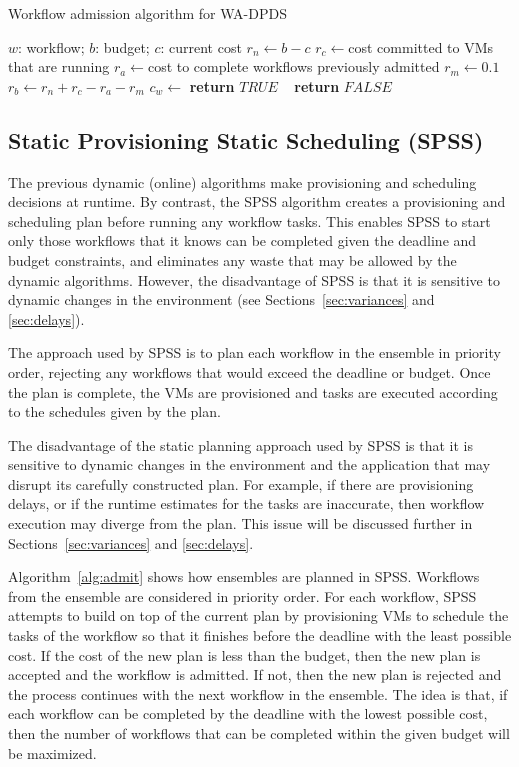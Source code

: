 \documentclass[preprint,5p]{elsarticle}
\begin{document}
\begin{algorithm}[tb]
\caption{Workflow admission algorithm for WA-DPDS}
\label{alg:wa-dpds}
{\footnotesize
\begin{algorithmic}[1]
\Require $w$: workflow; $b$: budget; $c$: current cost
    \State $r_n\gets b-c$ 
    \State $r_c\gets $cost committed to VMs that are running
    \State $r_a\gets $cost to complete workflows previously admitted
  \State $r_m\gets 0.1$ 
  \State $r_b\gets r_n+r_c-r_a-r_m$ 
  \State $c_w\gets$ 
      \textbf{return} $TRUE$
    \Else ~  \textbf{return} $FALSE$
  \EndIf       
\EndProcedure
\end{algorithmic}
}
\end{algorithm}


\subsection{Static Provisioning Static Scheduling (SPSS)}

The previous dynamic (online) algorithms make provisioning and scheduling
decisions at runtime. By contrast, the SPSS algorithm creates a provisioning
and scheduling plan before running any workflow tasks. This enables SPSS to
start only those workflows that it knows can be completed given the deadline and
budget constraints, and eliminates any waste that may be allowed by the dynamic
algorithms. However, the disadvantage of SPSS is that it is sensitive to dynamic
changes in the environment (see Sections~\ref{sec:variances} and
\ref{sec:delays}).

The approach used by SPSS is to plan each workflow in the ensemble in priority
order, rejecting any workflows that would exceed the deadline or budget. Once the
plan is complete, the VMs are provisioned and tasks are executed according to
the schedules given by the plan.

The disadvantage of the static planning approach used by SPSS is that it is
sensitive to dynamic changes in the environment and the application that may
disrupt its carefully constructed plan. For example, if there are provisioning
delays, or if the runtime estimates for the tasks are inaccurate, then workflow
execution may diverge from the plan. This issue will be discussed further in
Sections~\ref{sec:variances} and \ref{sec:delays}.

Algorithm~\ref{alg:admit} shows how ensembles are planned in SPSS. Workflows
from the ensemble are considered in priority order. For each workflow, SPSS
attempts to build on top of the current plan by provisioning VMs to schedule the
tasks of the workflow so that it finishes before the deadline with the least
possible cost. If the cost of the new plan is less than the budget, then the new
plan is accepted and the workflow is admitted. If not, then the new plan is
rejected and the process continues with the next workflow in the ensemble. The
idea is that, if each workflow can be completed by the
deadline with the lowest possible cost, then the number of workflows that can be
completed within the given budget will be maximized.
\end{document}

